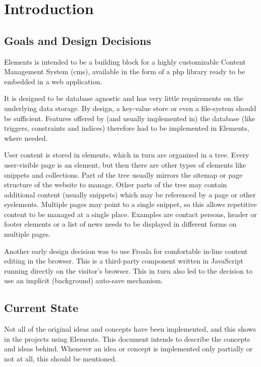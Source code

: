 \documentclass[table]{scrartcl}
\begin{document}

\section{Introduction}
\subsection{Goals and Design Decisions}
Elements is intended to be a building block for a highly customizable
Content Management System (\ac{cms}), available in the form of a
\ac{php} library ready to be embedded in a web application.

It is designed to be database agnostic and has very little
requirements on the underlying data storage. By design, a key-value
store or even a file-system should be sufficient. Features offered by
(and usually implemented in) the database (like triggers, constraints
and indices) therefore had to be implemented in Elements, where
needed.

User content is stored in elements, which in turn are organized in a
tree. Every user-visible page is an element, but then there are other
types of elements like snippets and collections. Part of the tree
usually mirrors the sitemap or page structure of the website to
manage. Other parts of the tree may contain additional content
(usually snippets) which may be referenced by a page or other
syelements. Multiple pages may point to a single snippet, so this allows
repetitive content to be managed at a single place. Examples are
contact persons, header or footer elements or a list of news needs to
be displayed in different forms on multiple pages.

Another early design decision was to use Froala for comfortable
in-line content editing in the browser. This is a third-party
component written in JavaScript running directly on the visitor's
browser. This in turn also led to the decision to use an implicit
(background) auto-save mechanism.

\subsection{Current State}
Not all of the original ideas and concepts have been implemented, and
this shows in the projects using Elements. This document intends to
describe the concepts and ideas behind. Whenever an idea or concept is
implemented only partially or not at all, this should be mentioned.
\end{document}
